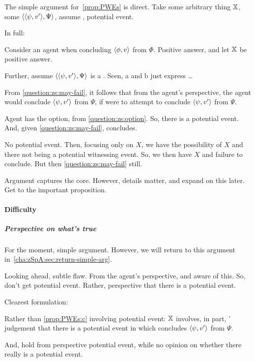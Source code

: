 \begin{note}
  The simple argument for~\autoref{prop:PWEs} is direct.
  Take some arbitrary thing \(\qzSaV{}\), some \(\pvp{\psi}{v'}{\Psi}\), assume \requ{}, potential event.

  In full:


  Consider an agent when concluding \(\pv{\phi}{v}\) from \(\Phi\).
  Positive answer, and let \(\qzSaV{}\) be positive answer.

  Further, assume \(\pvp{\psi}{v'}{\Psi}\) is a \requ{}.
  { \color{red} Seen, a and b just express \requ{}\dots}

  From \qzS{} \ref{question:zs:may-fail}, it follows that from the agent's perspective, the agent would conclude \(\pv{\psi}{v'}\) from \(\Psi\), if \vAgent{} were to attempt to conclude \(\pv{\psi}{v'}\) from \(\Psi\).

  Agent has the option, from \ref{question:zs:option}.
  So, there is a potential event.
  And, given \ref{question:zs:may-fail}, concludes.
\end{note}

\begin{note}
  No potential event.
  Then, focusing only on \(X\), we have the possibility of \(X\) and there not being a potential witnessing event.
  So, we then have \(X\) and failure to conclude.
  But then \ref{question:zs:may-fail} still.
\end{note}

\begin{note}
  Argument captures the core.
  However, details matter, and expand on this later.
  Get to the important proposition.
\end{note}

\paragraph{Difficulty}

\subparagraph{Perspective on what's true}

\begin{note}
  For the moment, simple argument.
  However, we will return to this argument in~\autoref{cha:zSpA:sec:return-simple-arg}.

  Looking ahead, subtle flaw.
  From the agent's perspective, and aware of this.
  So, don't get potential event.
  Rather, perspective that there is a potential event.

  Clearest formulation:

  Rather than \ref{prop:PWEs:c} involving potential event:
  {
    \color{red}
    \(\qzSaV{}\) involves, in part, \vAgent{}' judgement that there is a potential event in which \vAgent{} concludes \(\pv{\psi}{v'}\) from \(\Psi\).
  }

  And, hold from perspective potential event, while no opinion on whether there really is a potential event.
\end{note}

